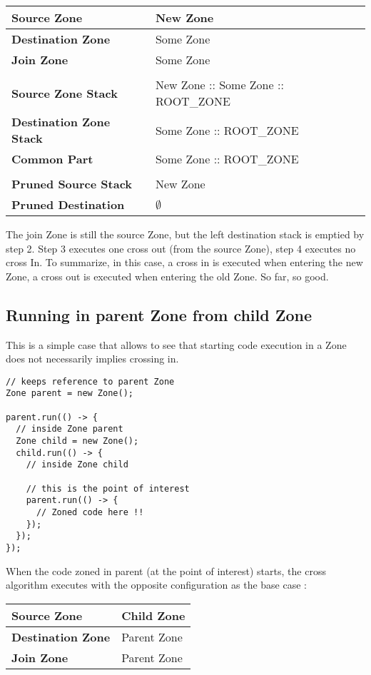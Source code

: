 \begin{tabular}{| l | l |}
\hline
\textbf{Source Zone} & New Zone
\\ \hline
\textbf{Destination Zone} & Some Zone
\\ \hline
\textbf{Join Zone} & Some Zone
\\ \hline
\multicolumn{2}{l}{}
\\ \hline
\textbf{Source Zone Stack} &  New Zone :: Some Zone :: ROOT\_ZONE
\\ \hline
\textbf{Destination Zone Stack } & Some Zone :: ROOT\_ZONE
\\ \hline
\textbf{Common Part} & Some Zone :: ROOT\_ZONE
\\ \hline
\multicolumn{2}{l}{}
\\ \hline
\textbf{Pruned Source Stack} & New Zone
\\ \hline
\textbf{Pruned Destination } & $\emptyset$
\\ \hline
\end{tabular}

The join Zone is still the source Zone, but the left destination stack is emptied by step 2. Step 3 executes one cross out (from the source Zone), step 4 executes no cross In. To summarize, in this case, a cross in is executed when entering the new Zone, a cross out is executed when entering the old Zone. So far, so good.

\subsection*{Running in parent Zone from child Zone}

This is a simple case that allows to see that starting code execution in a Zone does not necessarily implies crossing in.

\begin{lstlisting}
// keeps reference to parent Zone
Zone parent = new Zone();

parent.run(() -> {
  // inside Zone parent
  Zone child = new Zone();
  child.run(() -> {
    // inside Zone child

    // this is the point of interest
    parent.run(() -> {
      // Zoned code here !!
    });
  });
});
\end{lstlisting}

When the code zoned in parent (at the point of interest) starts, the cross algorithm executes with the opposite configuration as the base case :

\begin{tabular}{| l | l |}
\hline
\textbf{Source Zone} & Child Zone
\\ \hline
\textbf{Destination Zone} & Parent Zone
\\ \hline
\textbf{Join Zone} & Parent Zone
\\ \hline
\end{tabular}

